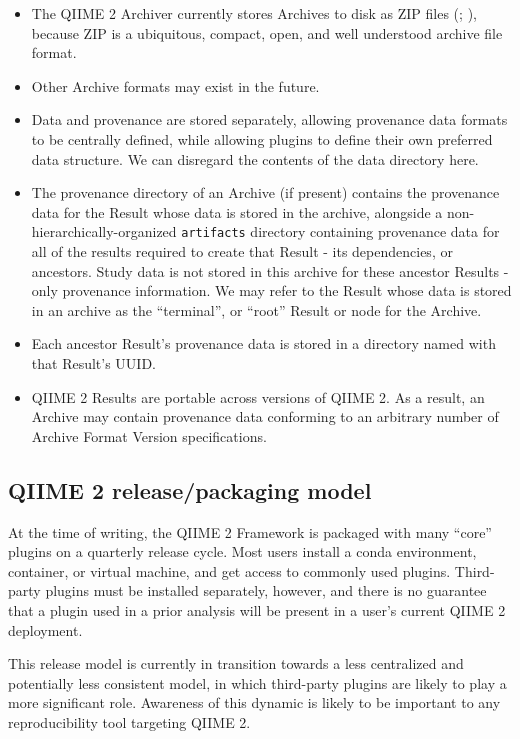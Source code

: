 \begin{itemize}
    \item The QIIME 2 Archiver currently stores Archives to disk as ZIP files
        (\cite{noauthor_appnote_2020}; \cite{iso_isoiec_2015}), because ZIP is a
        ubiquitous, compact, open, and well understood archive file format.
    \item Other Archive formats may exist in the future.
    \item Data and provenance are stored separately, allowing provenance data
        formats to be centrally defined, while allowing plugins to define their own
        preferred data structure. We can disregard the contents of the data directory here.
    \item The provenance directory of an Archive (if present) contains the
        provenance data for the Result whose data is stored in the archive,
        alongside a non-hierarchically-organized \texttt{artifacts} directory containing
        provenance data for all of the results required to create that Result - its
        dependencies, or ancestors. Study data is not stored in this archive for
        these ancestor Results - only provenance information. We may refer to the
        Result whose data is stored in an archive as the “terminal”, or “root”
        Result or node for the Archive.
    \item Each ancestor Result’s provenance data is stored in a directory named
        with that Result’s UUID.
    \item QIIME 2 Results are portable across versions of QIIME 2. As a result,
        an Archive may contain provenance data conforming to an arbitrary number of
        Archive Format Version specifications.
\end{itemize}

\subsection{QIIME 2 release/packaging model}
At the time of writing, the QIIME 2 Framework is packaged with many “core”
plugins on a quarterly release cycle. Most users install a conda environment,
container, or virtual machine, and get access to commonly used plugins.
Third-party plugins must be installed separately, however, and there is no
guarantee that a plugin used in a prior analysis will be present in a user’s
current QIIME 2 deployment.

This release model is currently in transition towards a less centralized and
potentially less consistent model, in which third-party plugins are likely to
play a more significant role. Awareness of this dynamic is likely to be
important to any reproducibility tool targeting QIIME 2.

